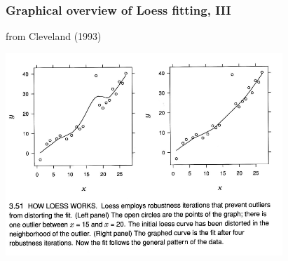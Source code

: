 \documentclass{beamer}
\begin{document}
\begin{frame}
  \frametitle{Graphical overview of Loess fitting, III}  

{\tiny from Cleveland (1993)}
\begin{center}
\includegraphics[height=3in]{loess3.pdf}
\end{center}  

\end{frame}



\end{document}
